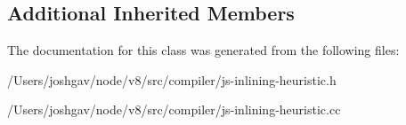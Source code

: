 \subsection*{Additional Inherited Members}


The documentation for this class was generated from the following files\+:\begin{DoxyCompactItemize}
\item 
/\+Users/joshgav/node/v8/src/compiler/js-\/inlining-\/heuristic.\+h\item 
/\+Users/joshgav/node/v8/src/compiler/js-\/inlining-\/heuristic.\+cc\end{DoxyCompactItemize}
